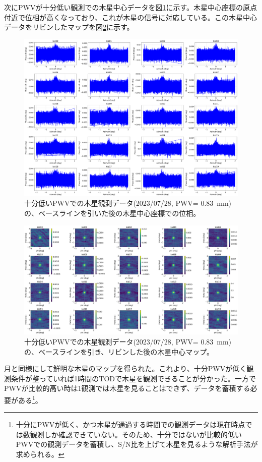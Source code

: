 次にPWVが十分低い観測での木星中心データを図\ref{5987_phase}に示す。木星中心座標の原点付近で位相が高くなっており、これが木星の信号に対応している。この木星中心データをリビンしたマップを図\ref{5987_map}に示す。
\begin{figure}[htbp]
  \centering
  \includegraphics[width=0.65\columnwidth]{5_alignment/figs/5987_jupiter_sub_phase.png}
  \caption{十分低いPWVでの木星観測データ(2023/07/28, PWV= \SI{0.83}{mm})の、ベースラインを引いた後の木星中心座標での位相。}
  \label{5987_phase}
\end{figure}
\begin{figure}[htbp]
  \centering
  \includegraphics[width=0.85\columnwidth]{5_alignment/figs/5987_juputer_map.png}
  \caption{十分低いPWVでの木星観測データ(2023/07/28, PWV= \SI{0.83}{mm})の、ベースラインを引き、リビンした後の木星中心マップ。}
  \label{5987_map}
\end{figure}
月と同様にして鮮明な木星のマップを得られた。これより、十分PWVが低く観測条件が整っていれば1時間のTODで木星を観測できることが分かった。一方でPWVが比較的高い時は1観測では木星を見ることはできず、データを蓄積する必要がある\footnote{十分にPWVが低く、かつ木星が通過する時間での観測データは現在時点では数観測しか確認できていない。そのため、十分ではないが比較的低いPWVでの観測データを蓄積し、S/N比を上げて木星を見るような解析手法が求められる。}。

